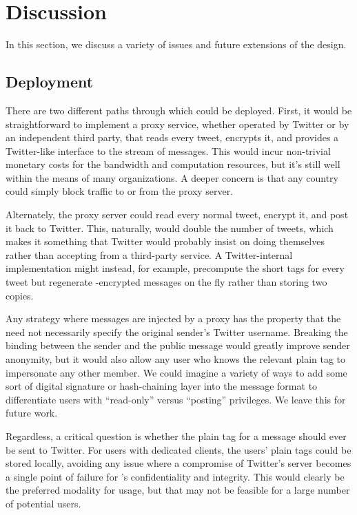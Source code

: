 \section{Discussion} \label{sec:discuss}

In this section, we discuss a variety of issues and future extensions of the \hoot design.

\subsection{Deployment}

There are two different paths through which \hoot could be deployed. First, it would be straightforward to implement a proxy service, whether operated by Twitter or by an independent third party, that reads every tweet, encrypts it, and provides a Twitter-like interface to the stream of \hoot messages. This would incur non-trivial monetary costs for the bandwidth and computation resources, but it's still well within the means of many organizations. A deeper concern is that any country could simply block traffic to or from the \hoot proxy server.

Alternately, the proxy server could read every normal tweet, encrypt it, and post it back to Twitter. This, naturally, would double the number of tweets, which makes it something that Twitter would probably insist on doing themselves rather than accepting from a third-party service. A Twitter-internal implementation might instead, for example, precompute the short tags for every tweet but regenerate \hoot-encrypted messages on the fly rather than storing two copies.

Any strategy where \hoot messages are injected by a proxy has the property that the \hoot need not necessarily specify the original sender's Twitter username.  Breaking the binding between the sender and the public \hoot message would greatly improve sender anonymity, but it would also allow any user who knows the relevant plain tag to impersonate any other member. We could imagine a variety of ways to add some sort of digital signature or hash-chaining layer into the \hoot message format to differentiate users with ``read-only'' versus ``posting'' privileges. We leave this for future work.

Regardless, a critical question is whether the plain tag for a \hoot message should ever be sent to Twitter. For users with dedicated clients, the users' plain tags could be stored locally, avoiding any issue where a compromise of Twitter's server becomes a single point of failure for \hoot's confidentiality and integrity. This would clearly be the preferred modality for \hoot usage, but that may not be feasible for a large number of potential \hoot users.

